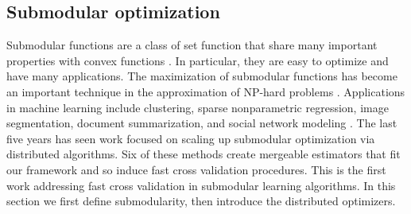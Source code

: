 \documentclass[thesis.tex]{subfiles}
\newcommand{\wpca}{\hat\w^\textit{pca}}
\newcommand{\wlbk}{\hat\w^\textit{lbk}}
\begin{document}
%


\subsection{Submodular optimization}
\label{sec:merge:submodular}

Submodular functions are a class of set function that share many important properties with convex functions \citep{lovasz1983submodular}.
In particular, they are easy to optimize and have many applications. 
The maximization of submodular functions has become an important technique in the approximation of NP-hard problems \citep{krause14survey}.
Applications in machine learning include clustering, sparse nonparametric regression, image segmentation, document summarization, and social network modeling \citep[see references within][]{mirzasoleiman2016distributed}.
The last five years has seen work focused on scaling up submodular optimization via distributed algorithms.
Six of these methods create mergeable estimators that fit our framework
\citep{mirzasoleiman2013distributed,barbosa2015power,malkomes2015fast,bhaskara2016greedy,barbosa2016new,mirzasoleiman2016distributed}
and so induce fast cross validation procedures.
This is the first work addressing fast cross validation in submodular learning algorithms.
In this section we first define submodularity,
then introduce the distributed optimizers.
\end{document}
